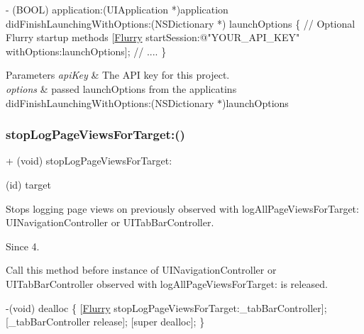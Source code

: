 \begin{DoxyCode}
   - (BOOL) application:(UIApplication *)application didFinishLaunchingWithOptions:(NSDictionary *)
      launchOptions
\{
\textcolor{comment}{// Optional Flurry startup methods}
[\hyperlink{interfaceFlurry}{Flurry} startSession:\textcolor{stringliteral}{@"YOUR\_API\_KEY"} withOptions:launchOptions];
\textcolor{comment}{// ....}
\}
\end{DoxyCode}



\begin{DoxyParams}{Parameters}
{\em api\+Key} & The A\+PI key for this project. \\
\hline
{\em options} & passed launch\+Options from the applicatin\textquotesingle{}s did\+Finish\+Launching\+With\+Options\+:(\+N\+S\+Dictionary $\ast$)launch\+Options \\
\hline
\end{DoxyParams}
\mbox{\label{interfaceFlurry_a732b380542c75c2f12d6ec90b9959aeb}} 
\subsubsection{\texorpdfstring{stop\+Log\+Page\+Views\+For\+Target\+:()}{stopLogPageViewsForTarget:()}}
{\footnotesize\ttfamily + (void) stop\+Log\+Page\+Views\+For\+Target\+: \begin{DoxyParamCaption}\item[{(id)}]{target }\end{DoxyParamCaption}}



Stops logging page views on previously observed with log\+All\+Page\+Views\+For\+Target\+: {\ttfamily U\+I\+Navigation\+Controller} or {\ttfamily U\+I\+Tab\+Bar\+Controller}. 

\begin{DoxySince}{Since}
4.
\end{DoxySince}
Call this method before instance of {\ttfamily U\+I\+Navigation\+Controller} or {\ttfamily U\+I\+Tab\+Bar\+Controller} observed with log\+All\+Page\+Views\+For\+Target\+: is released.


\begin{DoxyCode}
  -(void) dealloc
\{
[\hyperlink{interfaceFlurry}{Flurry} stopLogPageViewsForTarget:\_tabBarController];
[\_tabBarController release];
[super dealloc];
\}
\end{DoxyCode}



